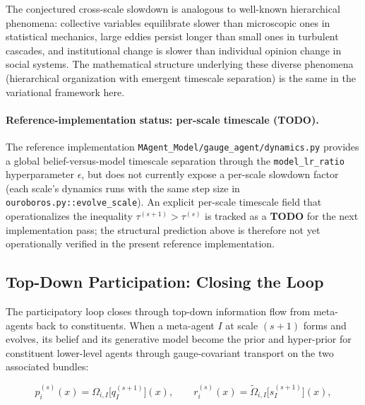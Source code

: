 \documentclass[11pt]{article}
\begin{document}
The conjectured cross-scale slowdown is analogous to well-known hierarchical phenomena: collective variables equilibrate slower than microscopic ones in statistical mechanics, large eddies persist longer than small ones in turbulent cascades, and institutional change is slower than individual opinion change in social systems. The mathematical structure underlying these diverse phenomena (hierarchical organization with emergent timescale separation) is the same in the variational framework here.

\paragraph{Reference-implementation status: per-scale timescale (\textbf{TODO}).}
The reference implementation \texttt{MAgent\_Model/gauge\_agent/dynamics.py} provides a global belief-versus-model timescale separation through the \texttt{model\_lr\_ratio} hyperparameter $\epsilon$, but does not currently expose a per-scale slowdown factor (each scale's dynamics runs with the same step size in \texttt{ouroboros.py::evolve\_scale}). An explicit per-scale timescale field that operationalizes the inequality $\tau^{(s+1)} > \tau^{(s)}$ is tracked as a \textbf{TODO} for the next implementation pass; the structural prediction above is therefore not yet operationally verified in the present reference implementation.

\subsection{Top-Down Participation: Closing the Loop}

The participatory loop closes through top-down information flow from meta-agents back to constituents. When a meta-agent $I$ at scale $(s+1)$ forms and evolves, its belief and its generative model become the prior and hyper-prior for constituent lower-level agents through gauge-covariant transport on the two associated bundles:

\begin{equation}
p_i^{(s)}(x) = \Omega_{i,I}\big[q_I^{(s+1)}\big](x),
\qquad
r_i^{(s)}(x) = \tilde\Omega_{i,I}\big[s_I^{(s+1)}\big](x),
\label{eq:topdown_priors}
\end{equation}
\end{document}
